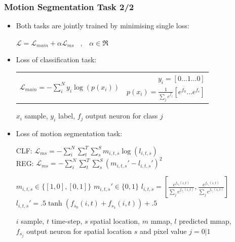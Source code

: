 \documentclass{beamer}
\begin{document}
\begin{frame}
\frametitle{Motion Segmentation Task 2/2}
\begin{adjustwidth}{-1.75em}{-1.75em}


\begin{itemize}
	\item Both tasks are jointly trained by minimising single loss:
	\begin{center}
	${\displaystyle {\mathcal{L} = \mathcal{L}_{main} + \alpha \mathcal{L}_{ms} \hspace{10pt} , \hspace{10pt} \alpha \in \Re} }$
	\end{center}
	
	\item Loss of classification task:
	
	\begin{center}
	\begin{tabular}{cr}
		\multirow{2}{*}{$ {\displaystyle \mathcal{L}_{main} = -\sum_i^N{y_i \log (p(x_i))} }$} 
		& $y_i = [0 \dots 1 \dots 0]$ \\
		& $ p(x_i) = \frac{1}{\sum_j e^{f_j}} [ e^{f_0} \dots e^{f_c} ]$
	\end{tabular}
	\end{center}

	{\scriptsize $x_i$ sample, $y_i$ label, $f_j$ output neuron for class $j$ }

	\item Loss of motion segmentation task:
	
	\begin{minipage}{.6\textwidth}
		CLF: $ {\displaystyle \mathcal{L}_{ms} = -\sum_i^N\sum_t^T\sum_s^S{m_{i,t,s} \log (l_{i,t,s}) } }$ \\
		REG: $ {\displaystyle \mathcal{L}_{ms} = -\sum_i^N\sum_t^T\sum_s^S{(m_{i,t,s}' - l_{i,t,s}')^2 } }$
	\end{minipage}%
	\begin{minipage}{.4\textwidth}
		\begin{flushright}
		${ \scriptstyle m_{i,t,s} \in \{ [1, 0], [0, 1] \} }$ 
		${ \scriptstyle m_{i,t,s}' \in \{ 0, 1 \} }$
		${ \scriptstyle l_{i,t,s} = \left [ \frac{e^{f_{s_0}(i, t)}}{\sum_j e^{f_{s_j}(i, t)}}, \frac{e^{f_{s_1}(i, t)}}{\sum_j e^{f_{s_j}(i, t)}} \right ] }$ \\
		${ \scriptstyle l_{i,t,s}' =  .5 \tanh (f_{s_0}(i, t) + f_{s_1}(i, t)) + .5 }$
		\end{flushright}
	\end{minipage}

	{\scriptsize $i$ sample, $t$ time-step, $s$ spatial location, $m$ mmap, $l$ predicted mmap, \\ \vspace*{-5pt} $f_{s_j}$ output neuron for spatial location $s$ and pixel value $j = 0|1$}

	
\end{itemize}

\end{adjustwidth}
\end{frame}
\end{document}
